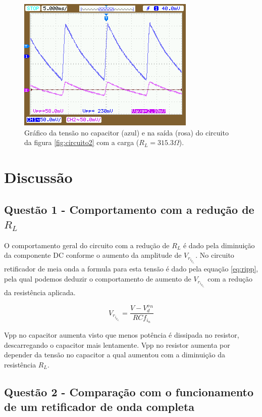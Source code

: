 \documentclass{abntex2}
\begin{document}
\begin{figure}[h]
  \centering
  \includegraphics[scale = 0.7]{exp2-5.png}
  \caption{Gráfico da tensão no capacitor (azul) e na saída (rosa) do circuito da figura \ref{fig:circuito2} com a carga ($R_L = 315.3\Omega$).}
  \label{fig:graf5}
\end{figure}
\pagebreak
\chapter{Discussão}

\section{Questão 1 - Comportamento com a redução de $R_L$}

O comportamento geral do circuito com a redução de $R_L$ é dado pela diminuição da componente DC conforme o aumento da amplitude de $V_r_i_p_p_l_e$. No circuito retificador de meia onda a formula para esta tensão é
dado pela equação \ref{eq:ripp}, pela qual podemos deduzir o comportamento de aumento de $V_r_i_p_p_l_e$ com a redução da resistência aplicada.

\begin{equation}
  V_r_i_p_p_l_e = \frac{V-V_d^o^n}{RCf_i_n}
  \label{eq:ripp}
\end{equation}

Vpp no capacitor aumenta visto que menos potência é dissipada no resistor, descarregando o capacitor mais lentamente.
Vpp no resistor aumenta por depender da tensão no capacitor a qual aumentou com a diminuição da resistência $R_L$.



\section{Questão 2 - Comparação com o funcionamento de um retificador de onda completa}
\end{document}
